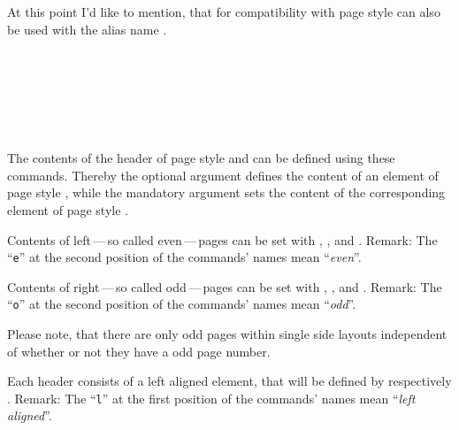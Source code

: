 At this point I'd like to mention, that for compatibility with
 page style  can also be used
with the alias name .
%
%
%

\begin{Declaration}
                \\
                \\
                \\
                \\
                \\
\end{Declaration}
%
%
%
%
%
%
The contents of the header of page style  and
 can be defined using these commands. Thereby the
optional argument defines the content of an element of page style
, while the mandatory argument sets the content
of the corresponding element of page style .

Contents of left\,---\,so called even\,---\,pages can be set with
, , and . Remark: The ``\texttt{e}''
at the second position of the commands' names mean ``\emph{even}''.

Contents of right\,---\,so called odd\,---\,pages can be set with
, , and . Remark: The ``\texttt{o}''
at the second position of the commands' names mean ``\emph{odd}''.

Please note, that there are only odd pages within single
side layouts independent of whether or not they have a odd page number.

Each header consists of a left aligned element, that will be defined by
 respectively . Remark: The ``\texttt{l}'' at the
first position of the commands' names mean ``\emph{left aligned}''.

